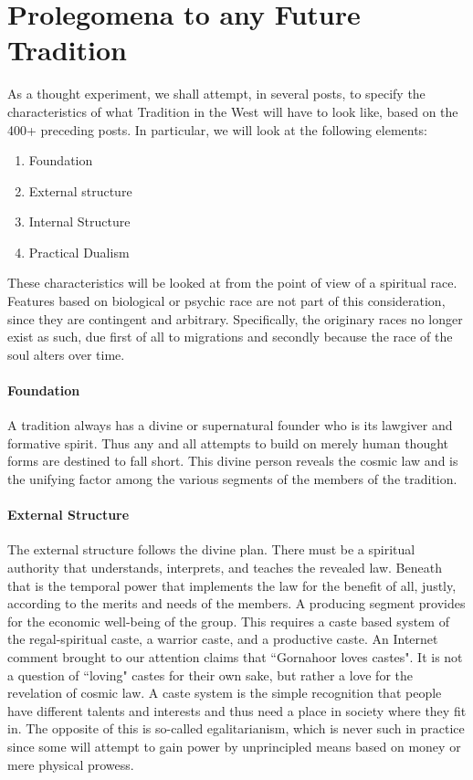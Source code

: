 \section{Prolegomena to any Future Tradition}

As a thought experiment, we shall attempt, in several posts, to specify the characteristics of what Tradition in the West will have to look like, based on the 400+ preceding posts. In particular, we will look at the following elements:

\begin{enumerate}
\item Foundation 
\item External structure 
\item Internal Structure 
\item Practical Dualism 
\end{enumerate}
These characteristics will be looked at from the point of view of a spiritual race. Features based on biological or psychic race are not part of this consideration, since they are contingent and arbitrary. Specifically, the originary races no longer exist as such, due first of all to migrations and secondly because the race of the soul alters over time.

\paragraph{Foundation}
A tradition always has a divine or supernatural founder who is its lawgiver and formative spirit. Thus any and all attempts to build on merely human thought forms are destined to fall short. This divine person reveals the cosmic law and is the unifying factor among the various segments of the members of the tradition.

\paragraph{External Structure}
The external structure follows the divine plan. There must be a spiritual authority that understands, interprets, and teaches the revealed law. Beneath that is the temporal power that implements the law for the benefit of all, justly, according to the merits and needs of the members. A producing segment provides for the economic well-being of the group. This requires a caste based system of the regal-spiritual caste, a warrior caste, and a productive caste. An Internet comment brought to our attention claims that ``Gornahoor loves castes". It is not a question of ``loving" castes for their own sake, but rather a love for the revelation of cosmic law. A caste system is the simple recognition that people have different talents and interests and thus need a place in society where they fit in. The opposite of this is so-called egalitarianism, which is never such in practice since some will attempt to gain power by unprincipled means based on money or mere physical prowess.

